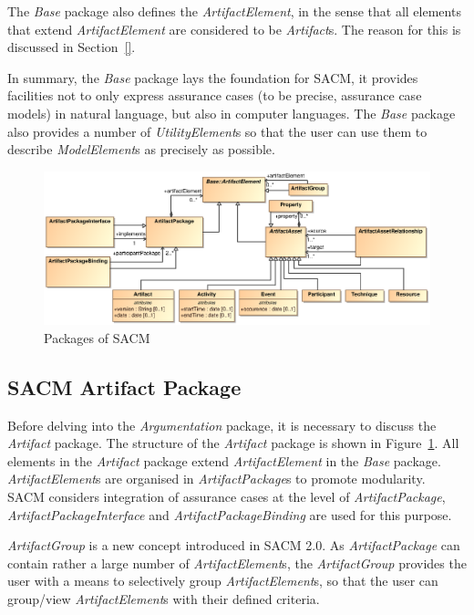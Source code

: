 The \textit{Base} package also defines the \textit{ArtifactElement}, in the sense that all elements that extend \textit{ArtifactElement} are considered to be \textit{Artifact}s. The reason for this is discussed in Section~\ref{}. 

In summary, the \textit{Base} package lays the foundation for SACM, it provides facilities not to only express assurance cases (to be precise, assurance case models) in natural language, but also in computer languages. The \textit{Base} package also provides a number of \textit{UtilityElement}s so that the user can use them to describe \textit{ModelElement}s as precisely as possible.

\begin{figure}
	\centering
	\includegraphics[width=1\linewidth]{fig/Artifact.eps}
	\caption{Packages of SACM}
	\label{fig:arti}
\end{figure}

\subsection{SACM Artifact Package}
\label{sec:artiPack}
Before delving into the \textit{Argumentation} package, it is necessary to discuss the \textit{Artifact} package. The structure of the \textit{Artifact} package is shown in Figure~\ref{fig:arti}. 
All elements in the \textit{Artifact} package extend \textit{ArtifactElement} in the \textit{Base} package. \textit{ArtifactElement}s are organised in \textit{ArtifactPackage}s to promote modularity. SACM considers integration of assurance cases at the level of \textit{ArtifactPackage}, \textit{ArtifactPackageInterface} and \textit{ArtifactPackageBinding} are used for this purpose.

\textit{ArtifactGroup} is a new concept introduced in SACM 2.0. As \textit{ArtifactPackage} can contain rather a large number of \textit{ArtifactElement}s, the \textit{ArtifactGroup} provides the user with a means to selectively group \textit{ArtifactElement}s, so that the user can group/view \textit{ArtifactElement}s with their defined criteria.

